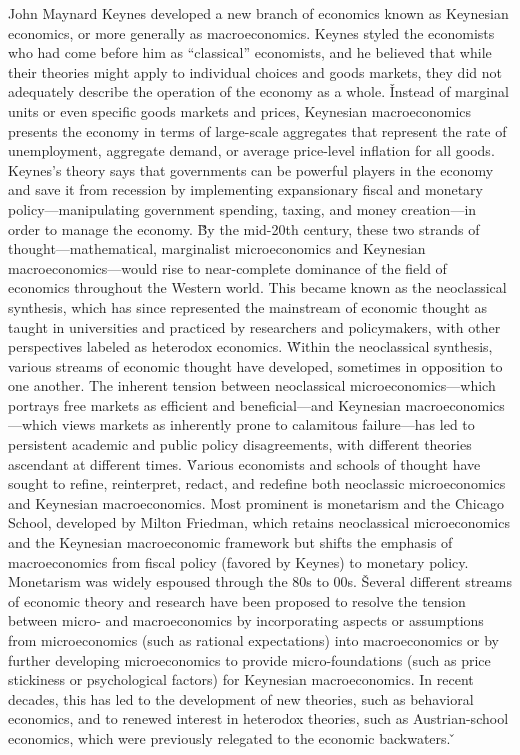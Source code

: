 John Maynard Keynes developed a new branch of economics known as Keynesian economics, or more generally as
macroeconomics. Keynes styled the economists who had come before him as ``classical'' economists, and he believed that
while their theories might apply to individual choices and goods markets, they did not adequately describe the
operation of the economy as a whole. \v

Instead of marginal units or even specific goods markets and prices, Keynesian macroeconomics presents the economy in
terms of large-scale aggregates that represent the rate of unemployment, aggregate demand, or average price-level
inflation for all goods. Keynes's theory says that governments can be powerful players in the economy and save it
from recession by implementing expansionary fiscal and monetary policy—manipulating government spending, taxing, and
money creation—in order to manage the economy. \v

By the mid-20th century, these two strands of thought—mathematical, marginalist microeconomics and Keynesian
macroeconomics—would rise to near-complete dominance of the field of economics throughout the Western world. This
became known as the neoclassical synthesis, which has since represented the mainstream of economic thought as taught
in universities and practiced by researchers and policymakers, with other perspectives labeled as heterodox economics. \v

Within the neoclassical synthesis, various streams of economic thought have developed, sometimes in opposition to one
another. The inherent tension between neoclassical microeconomics—which portrays free markets as efficient and
beneficial—and Keynesian macroeconomics—which views markets as inherently prone to calamitous failure—has led to
persistent academic and public policy disagreements, with different theories ascendant at different times. \v

Various economists and schools of thought have sought to refine, reinterpret, redact, and redefine both neoclassic
microeconomics and Keynesian macroeconomics. Most prominent is monetarism and the Chicago School, developed by Milton
Friedman, which retains neoclassical microeconomics and the Keynesian macroeconomic framework but shifts the emphasis
of macroeconomics from fiscal policy (favored by Keynes) to monetary policy. Monetarism was widely espoused through
the 80s to 00s. \v

Several different streams of economic theory and research have been proposed to resolve the tension between micro-
and macroeconomics by incorporating aspects or assumptions from microeconomics (such as rational expectations) into
macroeconomics or by further developing microeconomics to provide micro-foundations (such as price stickiness or
psychological factors) for Keynesian macroeconomics. In recent decades, this has led to the development of new
theories, such as behavioral economics, and to renewed interest in heterodox theories, such as Austrian-school
economics, which were previously relegated to the economic backwaters. \v

